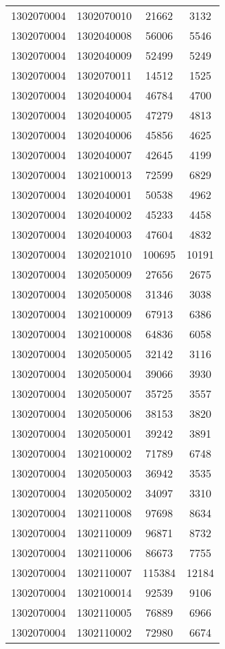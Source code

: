 \begin{longtable}[h]{llcc}
		1302070004 & 1302070010 & 21662 & 3132\\
		1302070004 & 1302040008 & 56006 & 5546\\
		1302070004 & 1302040009 & 52499 & 5249\\
		1302070004 & 1302070011 & 14512 & 1525\\
		1302070004 & 1302040004 & 46784 & 4700\\
		1302070004 & 1302040005 & 47279 & 4813\\
		1302070004 & 1302040006 & 45856 & 4625\\
		1302070004 & 1302040007 & 42645 & 4199\\
		1302070004 & 1302100013 & 72599 & 6829\\
		1302070004 & 1302040001 & 50538 & 4962\\
		1302070004 & 1302040002 & 45233 & 4458\\
		1302070004 & 1302040003 & 47604 & 4832\\
		1302070004 & 1302021010 & 100695 & 10191\\
		1302070004 & 1302050009 & 27656 & 2675\\
		1302070004 & 1302050008 & 31346 & 3038\\
		1302070004 & 1302100009 & 67913 & 6386\\
		1302070004 & 1302100008 & 64836 & 6058\\
		1302070004 & 1302050005 & 32142 & 3116\\
		1302070004 & 1302050004 & 39066 & 3930\\
		1302070004 & 1302050007 & 35725 & 3557\\
		1302070004 & 1302050006 & 38153 & 3820\\
		1302070004 & 1302050001 & 39242 & 3891\\
		1302070004 & 1302100002 & 71789 & 6748\\
		1302070004 & 1302050003 & 36942 & 3535\\
		1302070004 & 1302050002 & 34097 & 3310\\
		1302070004 & 1302110008 & 97698 & 8634\\
		1302070004 & 1302110009 & 96871 & 8732\\
		1302070004 & 1302110006 & 86673 & 7755\\
		1302070004 & 1302110007 & 115384 & 12184\\
		1302070004 & 1302100014 & 92539 & 9106\\
		1302070004 & 1302110005 & 76889 & 6966\\
		1302070004 & 1302110002 & 72980 & 6674\\

\end{longtable}
